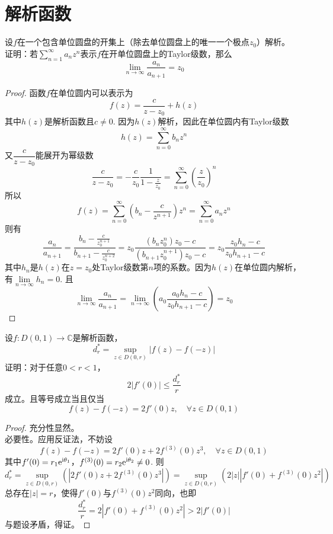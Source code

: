 \section{解析函数}

\begin{proposition}
    
    设$f$在一个包含单位圆盘的开集上（除去单位圆盘上的唯一一个极点$z_0$）解析。\\
    证明：若$\sum\limits_{n = 1}^{\infty}{a_nz^n}$表示$f$在开单位圆盘上的\textup{Taylor}级数，那么
    $$\lim\limits_{n \to \infty}{\dfrac{a_n}{a_{n + 1}}} = z_0$$

\end{proposition}

\begin{proof}
    
    函数$f$在单位圆内可以表示为
    $$f(z) = \dfrac{c}{z - z_0} + h(z)$$
    其中$h(z)$是解析函数且$c \neq 0$. 因为$h(z)$解析，因此在单位圆内有\textup{Taylor}级数
    $$h(z) = \sum\limits_{n = 0}^{\infty}{b_n z^n}$$
    又$\dfrac{c}{z - z_0}$能展开为幂级数
    $$\dfrac{c}{z - z_0} = -\dfrac{c}{z_0}\dfrac{1}{1 - \frac{z}{z_0}} = \sum\limits_{n = 0}^{\infty}{\left(\dfrac{z}{z_0}\right)^n}$$
    所以
    $$f(z) = \sum\limits_{n = 0}^{\infty}{\left(b_n - \dfrac{c}{z^{n + 1}}\right)z^n} = \sum\limits_{n = 0}^{\infty}{a_n z^n}$$
    则有
    $$\dfrac{a_n}{a_{n + 1}} = 
    \dfrac{b_n - \frac{c}{z_0^{n + 1}}} {b_{n + 1} - \frac{c}{z_0^{n + 2}}} = 
    z_0 \dfrac{(b_n z_0^n) z_0 - c} {(b_{n + 1}z_0^{n + 1}) z_0 - c} =
    z_0 \dfrac{z_0 h_n - c}{z_0 h_{n + 1} - c}$$
    其中$h_n$是$h(z)$在$z = z_0$处\textup{Taylor}级数第$n$项的系数。因为$h(z)$在单位圆内解析，有$\lim\limits_{n \to \infty}{h_n} = 0$. 且
    $$\lim\limits_{n \to \infty}{\dfrac{a_n}{a_{n + 1}}} = \lim\limits_{n \to \infty}{\left(a_0 \dfrac{a_0 h_n - c}{z_0h_{n + 1} - c}\right)} = z_0$$

\end{proof}

\begin{proposition}

    设$f : D(0,1) \to \mathbb{C}$是解析函数，
    $$d_r^{*} = \sup\limits_{z \in D(0,r)}{|f(z) - f(-z)|}$$
    证明：对于任意$0 < r < 1$，
    $$2|f'(0)| \leq \dfrac{d_r^{*}}{r}$$
    成立。且等号成立当且仅当
    $$f(z) - f(-z) = 2f'(0)z, \quad \forall z \in D(0,1)$$

\end{proposition}

\begin{proof}

    充分性显然。\\
    必要性。应用反证法，不妨设
    $$f(z) - f(-z) = 2f'(0)z + 2f^{(3)}(0)z^3, \quad \forall z \in D(0,1)$$
    其中$f'(0) = r_1\mathrm{e}^{\mathrm{i} \theta_1}$，$f^{(3)}(0) = r_2\mathrm{e}^{\mathrm{i} \theta_2} \neq 0$. 则
    $$d_r^{*} = \sup\limits_{z \in D(0,r)}{(|2f'(0)z + 2f^{(3)}(0)z^3|)} = \sup\limits_{z \in D(0,r)}{(2|z||f'(0) + f^{(3)}(0)z^2|)}$$
    总存在$|z| = r$，使得$f'(0)$与$f^{(3)}(0)z^2$同向，也即
    $$\dfrac{d_r^{*}}{r} = 2|f'(0) + f^{(3)}(0)z^2| > 2|f'(0)|$$
    与题设矛盾，得证。

\end{proof}

